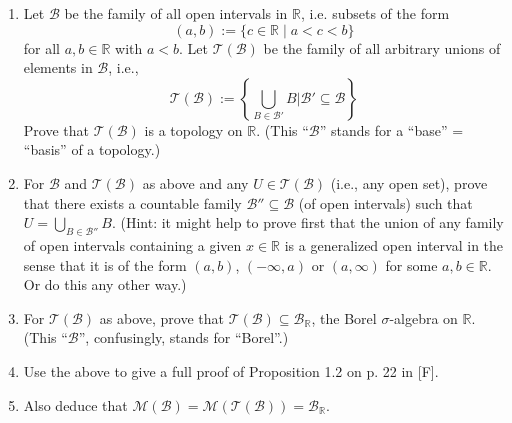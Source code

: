 \begin{mystexercise}\label{Open Set as a Topology}\label{open set as a topology}\begin{enumerate}
\item Let $\mathcal{B}$ be the family of all open intervals in $\mathbb{R}$, i.e. subsets of the form
\begin{equation}
(a, b) := \{c \in \mathbb{R} \mid a < c < b\}
\end{equation}
for all $a, b \in \mathbb{R}$ with $a < b$. Let $\mathcal{T}(\mathcal{B})$ be the family of all arbitrary unions of elements in $\mathcal{B}$, i.e.,
\begin{equation}
\mathcal{T}(\mathcal{B}) := \left\{ \bigcup_{B \in \mathcal{B}'} B \mathrel{\Big\vert{}} \mathcal{B}' \subseteq \mathcal{B} \right\}
\end{equation}
Prove that $\mathcal{T}(\mathcal{B})$ is a topology on $\mathbb{R}$. (This ``$\mathcal{B}$'' stands for a ``base'' = ``basis'' of a topology.)


\item For $\mathcal{B}$ and $\mathcal{T}(\mathcal{B})$ as above and any $U \in \mathcal{T}(\mathcal{B})$ (i.e., any open set), prove that there exists a countable family $\mathcal{B}'' \subseteq \mathcal{B}$ (of open intervals) such that $U = \bigcup_{B \in \mathcal{B}''} B$. (Hint: it might help to prove first that the union of any family of open intervals containing a given $x \in \mathbb{R}$ is a generalized open interval in the sense that it is of the form $(a, b)$, $( -\infty, a)$ or $(a, \infty)$ for some $a, b \in \mathbb{R}$. Or do this any other way.)
\item For $\mathcal{T}(\mathcal{B})$ as above, prove that $\mathcal{T}(\mathcal{B}) \subseteq \mathcal{B}_{\mathbb{R}}$, the Borel $\sigma$-algebra on $\mathbb{R}$. (This ``$\mathcal{B}$'', confusingly, stands for ``Borel''.)
\item Use the above to give a full proof of Proposition 1.2 on p. 22 in [F].
\item Also deduce that $\mathcal{M}(\mathcal{B}) = \mathcal{M}(\mathcal{T}(\mathcal{B})) = \mathcal{B}_{\mathbb{R}}$.
\end{enumerate}

\end{mystexercise}
